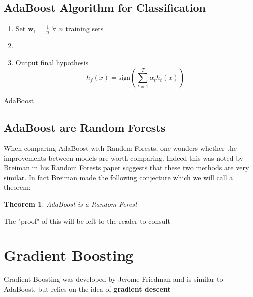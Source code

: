 \documentclass[11pt,a4paper]{report}
\newtheorem{theorem}{Theorem}
\begin{document}
\subsection{AdaBoost Algorithm for Classification}
\begin{algorithm}
\SetAlgoLined
\begin{enumerate}
    \item Set $\textbf{w}_1 = \frac{1}{n}$ $\forall$ $n$ training sets
    
    \item {}
    
    \item Output final hypothesis
    \[ h_f (x) = \text{sign} \left(\sum_{t=1}^T \alpha_t h_t (x) \right) \]
\end{enumerate}
\caption{AdaBoost}
\end{algorithm}



\subsection{AdaBoost are Random Forests}
When comparing AdaBoost with Random Forests, one wonders whether the improvements between models are worth comparing. Indeed this was noted by Breiman in his Random Forests paper \cite{randomforest} suggests that these two methods are very similar. In fact Breiman made the following conjecture which we will call a theorem:
\begin{theorem}
AdaBoost is a Random Forest
\end{theorem}
The "proof" of this will be left to the reader to consult \cite{randomforest}

\section{Gradient Boosting}
Gradient Boosting was developed by Jerome Friedman \cite{gbm} and is similar to AdaBoost, but relies on the idea of \textbf{gradient descent} 
\end{document}
